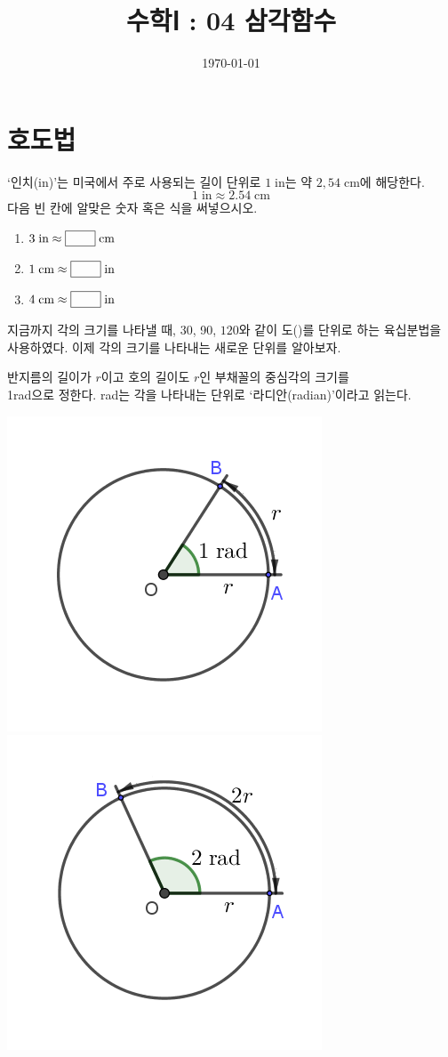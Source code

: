 \documentclass{oblivoir}
\begin{document}
\title{수학Ⅰ : 04 삼각함수}
\author{}
\date{\today}
\maketitle
\tableofcontents
\newpage

\section{호도법}

%
\label{rad1}
`인치(in)'는  미국에서 주로 사용되는 길이 단위로 \(1\;\text{in}\)는 약 \(2,54\;\text{cm}\)에 해당한다.
\[1\;\text{in}\approx2.54\;\text{cm}\]
다음 빈 칸에 알맞은 숫자 혹은 식을 써넣으시오.
\begin{enumerate}
\item
\(3\;\text{in}\approx\pb{8.62}\;\text{cm}\)
\item
\(1\;\text{cm}\approx\pb{0.39}\;\text{in}\)
\item
\(4\;\text{cm}\approx\pb{0.91}\;\text{in}\)
\end{enumerate}

\bigskip\bigskip
지금까지 각의 크기를 나타낼 때, 30\textdegree{}, 90\textdegree{}, \(120\)\textdegree{}와 같이 도(\textdegree{})를 단위로 하는 육십분법을 사용하였다.
이제 각의 크기를 나타내는 새로운 단위를 알아보자.
\begin{mdframed}
%
\label{rad2}
반지름의 길이가 \(r\)이고 호의 길이도 \(r\)인 부채꼴의 중심각의 크기를\\ 1rad으로 정한다.
rad는 각을 나타내는 단위로 `라디안(radian)'이라고 읽는다.
\begin{center}
\includegraphics[width=.3\textwidth]{rad_2-1}
\qquad\qquad
\includegraphics[width=.3\textwidth]{rad_2-2}
\end{center}
\end{mdframed}
\end{document}
